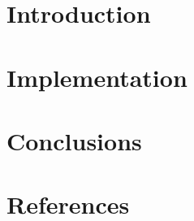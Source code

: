 \section[Intro]{Introduction}


\section[Impl]{Implementation}


\section[End]{Conclusions}


\section[Refs]{References}
